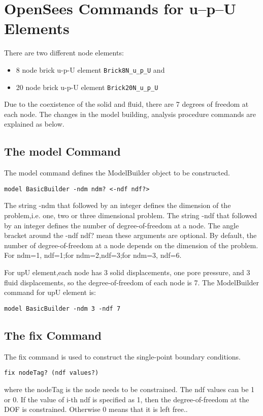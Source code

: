 \section{OpenSees Commands for {u--p--U} Elements}
\label{Tcl commands for upU elements}


There are two different node elements: 
\begin{itemize}
\item 8 node brick u-p-U element \texttt{Brick8N\_u\_p\_U} and 
\item 20 node brick u-p-U element   \texttt{Brick20N\_u\_p\_U} 
\end{itemize}

Due to the coexistence of the solid and fluid,
there are 7 degrees of freedom at each node. 
The changes in the model building, analysis procedure commands
are explained as below.

\subsection{The model Command}
\label{The model Command}
The model command defines the ModelBuilder object to be constructed.
\begin{verbatim}
model BasicBuilder -ndm ndm? <-ndf ndf?>
\end{verbatim}
The string -ndm that followed by an integer defines the dimension of the problem,i.e. one,
two or three dimensional problem. The string -ndf that followed by an integer defines the
number of degree-of-freedom at a node. The angle bracket around the -ndf ndf? mean these
arguments are optional. By default, the number of degree-of-freedom at a node depends on the
dimension of the problem. For ndm=1, ndf=1;for ndm=2,ndf=3;for ndm=3, ndf=6.

For upU element,each node has 3 solid displacements, one pore pressure, and 3 fluid displacements,
so the degree-of-freedom of each node is 7. The ModelBuilder command for upU element is:
\begin{verbatim}
model BasicBuilder -ndm 3 -ndf 7
\end{verbatim}

\subsection{The fix Command}
\label{The fix Command}
The fix command is used to construct the single-point boundary conditions.
\begin{verbatim}
fix nodeTag? (ndf values?)
\end{verbatim}
where the nodeTag is the node needs to be constrained. The ndf values can be 1 or 0. If the value
of i-th ndf is specified as 1, then the degree-of-freedom at the DOF is constrained. Otherwise
0 means that it is left free..

